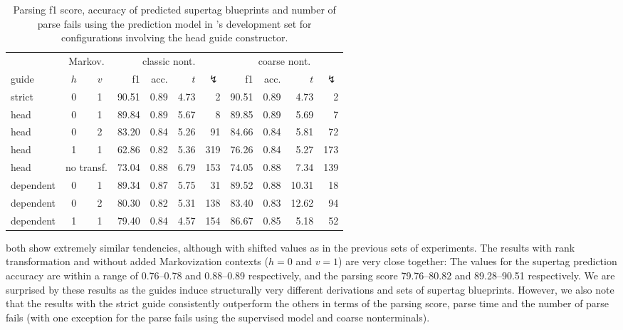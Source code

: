 \documentclass[../../document.tex]{subfiles}
\begin{document}
    \begin{table}
        \caption{\label{tbl:gridsearch:head:3}
        Parsing f1 score, accuracy of predicted supertag blueprints and number of parse fails using the  prediction model in \negra{}'s development set for configurations involving the head guide constructor.
        }
        \centering
        \vspace{.2cm}
        \begin{tabular}{lcc|rrrr|rrrr}
            \toprule
                    & \multicolumn{2}{c|}{Markov.} & \multicolumn{4}{c|}{classic nont.} &  \multicolumn{4}{c}{coarse nont.} \\
                    guide           & \(h\) & \(v\) & f1 & acc. & $t$ & $\lightning$ & f1 & acc. & $t$ & $\lightning$  \\ \hline \rowcolor{black!10}
strict & 0 & 1                         & 90.51 & 0.89 & 4.73 &   2 & 90.51 & 0.89 &  4.73 &   2 \\\hline
head & 0 & 1                           & 89.84 & 0.89 & 5.67 &   8 & 89.85 & 0.89 &  5.69 &   7 \\
head & 0 & 2                           & 83.20 & 0.84 & 5.26 &  91 & 84.66 & 0.84 &  5.81 &  72 \\
head & 1 & 1                           & 62.86 & 0.82 & 5.36 & 319 & 76.26 & 0.84 &  5.27 & 173 \\
head & \multicolumn{2}{c|}{no transf.} & 73.04 & 0.88 & 6.79 & 153 & 74.05 & 0.88 &  7.34 & 139 \\\hline
dependent & 0 & 1                      & 89.34 & 0.87 & 5.75 &  31 & 89.52 & 0.88 & 10.31 &  18 \\
dependent & 0 & 2                      & 80.30 & 0.82 & 5.31 & 138 & 83.40 & 0.83 & 12.62 &  94 \\
dependent & 1 & 1                      & 79.40 & 0.84 & 4.57 & 154 & 86.67 & 0.85 &  5.18 &  52 \\
\hline
\bottomrule
        \end{tabular}
    \end{table}

     both show extremely similar tendencies, although with shifted values as in the previous sets of experiments.
    The results with rank transformation and without added Markovization contexts ($h=0$ and $v=1$) are very close together:
        The values for the supertag prediction accuracy are within a range of 0.76--0.78 and 0.88--0.89 respectively, and the parsing score 79.76--80.82 and 89.28--90.51 respectively.
    We are surprised by these results as the guides induce structurally very different derivations and sets of supertag blueprints.
    However, we also note that the results with the strict guide consistently outperform the others in terms of the parsing score, parse time and the number of parse fails (with one exception for the parse fails using the supervised model and coarse nonterminals).
\end{document}
